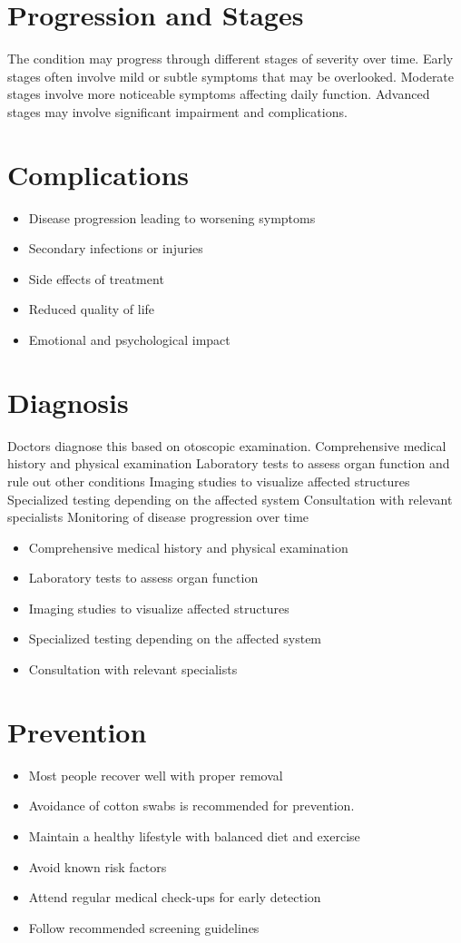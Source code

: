 \section{Progression and Stages}
The condition may progress through different stages of severity over time. Early stages often involve mild or subtle symptoms that may be overlooked. Moderate stages involve more noticeable symptoms affecting daily function. Advanced stages may involve significant impairment and complications.
\section{Complications}
\begin{itemize}[noitemsep]
  \item Disease progression leading to worsening symptoms
  \item Secondary infections or injuries
  \item Side effects of treatment
  \item Reduced quality of life
  \item Emotional and psychological impact
\end{itemize}
\section{Diagnosis}
Doctors diagnose this based on otoscopic examination. Comprehensive medical history and physical examination Laboratory tests to assess organ function and rule out other conditions Imaging studies to visualize affected structures Specialized testing depending on the affected system Consultation with relevant specialists Monitoring of disease progression over time

\begin{itemize}[noitemsep]
  \item Comprehensive medical history and physical examination
  \item Laboratory tests to assess organ function
  \item Imaging studies to visualize affected structures
  \item Specialized testing depending on the affected system
  \item Consultation with relevant specialists
\end{itemize}
\section{Prevention}
\begin{itemize}[noitemsep]
  \item Most people recover well with proper removal
  \item Avoidance of cotton swabs is recommended for prevention.
  \item Maintain a healthy lifestyle with balanced diet and exercise
  \item Avoid known risk factors
  \item Attend regular medical check-ups for early detection
  \item Follow recommended screening guidelines
\end{itemize}
